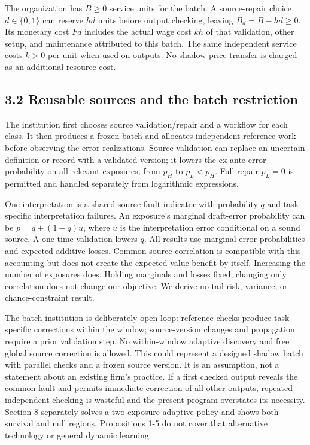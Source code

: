 \documentclass[
  11pt,
  a4paper,
]{article}
\begin{document}
The organization has \(B\geq0\) service units for the batch. A
source-repair choice \(d\in\{0,1\}\) can reserve \(h d\) units before
output checking, leaving \(B_d=B-hd\geq0\). Its monetary cost \(Fd\)
includes the actual wage cost \(kh\) of that validation, other setup,
and maintenance attributed to this batch. The same independent service
costs \(k>0\) per unit when used on outputs. No shadow-price transfer is
charged as an additional resource cost.

\hypertarget{reusable-sources-and-the-batch-restriction}{%
\subsection{3.2 Reusable sources and the batch
restriction}\label{reusable-sources-and-the-batch-restriction}}

The institution first chooses source validation/repair and a workflow
for each class. It then produces a frozen batch and allocates
independent reference work before observing the error realizations.
Source validation can replace an uncertain definition or record with a
validated version; it lowers the ex ante error probability on all
relevant exposures, from \(p_H\) to \(p_L<p_H\). Full repair \(p_L=0\)
is permitted and handled separately from logarithmic expressions.

One interpretation is a shared source-fault indicator with probability
\(q\) and task-specific interpretation failures. An exposure's marginal
draft-error probability can be \(p=q+(1-q)u\), where \(u\) is the
interpretation error conditional on a sound source. A one-time
validation lowers \(q\). All results use marginal error probabilities
and expected additive losses. Common-source correlation is compatible
with this accounting but does not create the expected-value benefit by
itself. Increasing the number of exposures does. Holding marginals and
losses fixed, changing only correlation does not change our objective.
We derive no tail-risk, variance, or chance-constraint result.

The batch institution is deliberately open loop: reference checks
produce task-specific corrections within the window; source-version
changes and propagation require a prior validation step. No
within-window adaptive discovery and free global source correction is
allowed. This could represent a designed shadow batch with parallel
checks and a frozen source version. It is an assumption, not a statement
about an existing firm's practice. If a first checked output reveals the
common fault and permits immediate correction of all other outputs,
repeated independent checking is wasteful and the present program
overstates its necessity. Section 8 separately solves a two-exposure
adaptive policy and shows both survival and null regions. Propositions
1-5 do not cover that alternative technology or general dynamic
learning.
\end{document}
